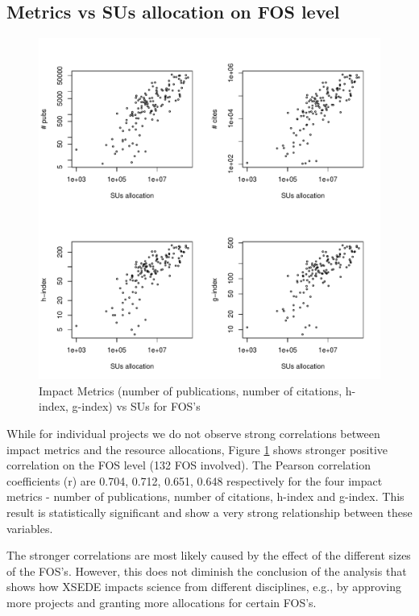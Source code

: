 \documentclass{sig-alternate}
\begin{document}
\subsection{Metrics vs SUs allocation on FOS level} 
 
\begin{figure}[!htb] 
  \centering 
    \includegraphics[width=1.0\columnwidth]{images/03_metrics_vs_alloc_fos.pdf} 
  \caption{Impact Metrics (number of publications, number of citations, h-index, g-index) vs SUs for FOS's}\label{F:metrics-vs-alloc-fos} 
\end{figure} 

While for individual projects we do not observe strong correlations between impact metrics and the resource allocations, Figure \ref {F:metrics-vs-alloc-fos} shows stronger positive correlation on the FOS level (132 FOS involved). The Pearson correlation coefficients (r) are 0.704, 0.712, 0.651, 0.648 respectively for the four impact metrics - number of publications, number of citations, h-index and g-index. This result is statistically significant and show a very strong relationship between these variables.

The stronger correlations are most likely caused by the effect of the different sizes of the FOS's. However, this does not diminish the conclusion of the analysis that shows how XSEDE impacts science from different disciplines, e.g., by approving more projects and granting more allocations for certain FOS's.
 
\end{document}
